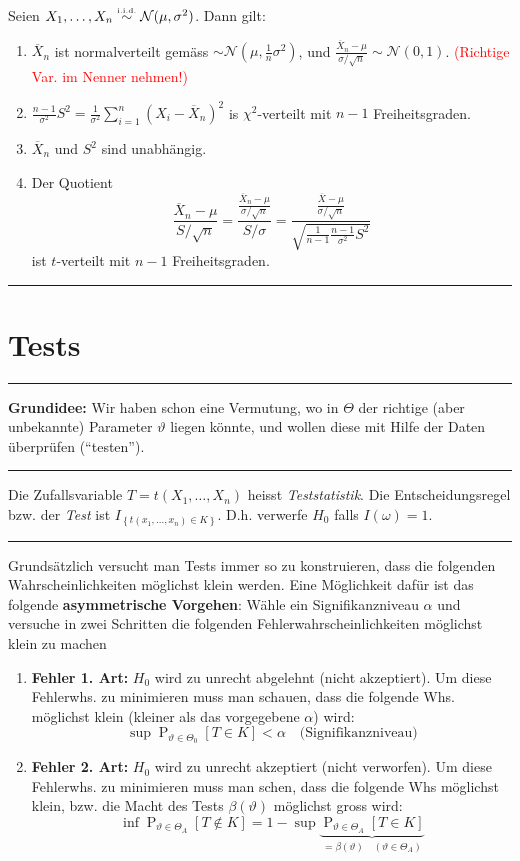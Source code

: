 \documentclass[a4paper, 12pt]{extarticle}
\newcommand{\sep}{\vspace{5pt}\noindent\hrule\vspace{5pt}}
\newcommand{\cN}{\mathcal{N}}
\newcommand{\set}[1]{\left\{ #1 \right\}}
\newcommand{\Prob}[2][]{\operatorname{P}_{#1}\left[ #2 \right]}
\newcommand{\riid}{\stackrel{\text{\tiny i.i.d.}}{\sim}}
\begin{document}
\begin{multicols*}{2}
\Thm Seien $X_1,\ldots,X_n\riid \cN(\mu,\sigma^2)$. Dann gilt:
\begin{enumerate}[label=\arabic*)]
  \item $\overline{X}_n$ ist normalverteilt gemäss
  $\sim\cN(\mu,\frac{1}{n}\sigma^2)$, und
  $\frac{\overline{X}_n-\mu}{\sigma/\sqrt{n}}\sim\cN(0,1)$.
  \textcolor{red}{ (Richtige Var. im Nenner nehmen!)}
  \item $\frac{n-1}{\sigma^2}S^2 = \frac{1}{\sigma^2}\sum_{i=1}^n
  (X_i-\overline{X}_n)^2$ is $\chi^2$-verteilt mit $n-1$ Freiheitsgraden.
  \item $\overline{X}_n$ und $S^2$ sind unabhängig.
  \item Der Quotient
  \[
  \frac{\overline{X}_n-\mu}{S/\sqrt{n}} =
  \frac{\frac{\overline{X}_n-\mu}{\sigma/\sqrt{n}}}{S/\sigma}
  =\frac{\frac{\overline{X}-\mu}{\sigma/\sqrt{n}}}{
  \sqrt{\frac{1}{n-1}\frac{n-1}{\sigma^2}S^2}}
  \]
  ist $t$-verteilt mit $n-1$ Freiheitsgraden.
\end{enumerate}

\sep

\section{Tests}

\sep

\textbf{Grundidee:} Wir haben schon eine Vermutung, wo in $\Theta$ der richtige
(aber unbekannte) Parameter $\vartheta$ liegen könnte, und wollen diese mit
Hilfe der Daten überprüfen (``testen'').

\sep

 Die Zufallsvariable
$T=t(X_1,\ldots,X_n)$ heisst \emph{Teststatistik}. Die Entscheidungsregel
bzw. der \emph{Test} ist $I_{\set{t(x_1,\ldots,x_n)\in K}}$. D.h. verwerfe $H_0$
falls $I(\omega)=1$.

\sep

Grundsätzlich versucht man Tests immer so zu konstruieren, dass die folgenden
Wahrscheinlichkeiten möglichst klein werden. Eine Möglichkeit dafür ist das
folgende \textbf{asymmetrische Vorgehen}: Wähle ein Signifikanzniveau $\alpha$
und versuche in zwei Schritten die folgenden Fehlerwahrscheinlichkeiten möglichst
klein zu machen

\begin{enumerate}[label=\alph*)]
  \item \textbf{Fehler 1. Art:} $H_0$ wird zu unrecht abgelehnt (nicht
  akzeptiert). Um diese Fehlerwhs. zu minimieren muss man
  schauen, dass die folgende Whs. möglichst klein (kleiner als das
  vorgegebene $\alpha$) wird:
  \[
  \sup \Prob[\vartheta\in\Theta_0]{T\in K} < \alpha 
  \quad \text{(Signifikanzniveau)}
  \]
  \item \textbf{Fehler 2. Art:} $H_0$ wird zu unrecht akzeptiert (nicht
  verworfen). Um diese Fehlerwhs. zu minimieren muss man schen, dass  die
  folgende Whs möglichst klein, bzw. die Macht des Tests $\beta(\vartheta)$
  möglichst gross wird:
  \[
  \inf \Prob[\vartheta\in\Theta_A]{T\not\in K} = 1 - \sup
  \underbrace{\Prob[\vartheta\in\Theta_A]{T\in K}}_{=\beta(\vartheta) \quad
  (\vartheta\in\Theta_A)}
  \]
\end{enumerate}


\end{multicols*}
\end{document}
